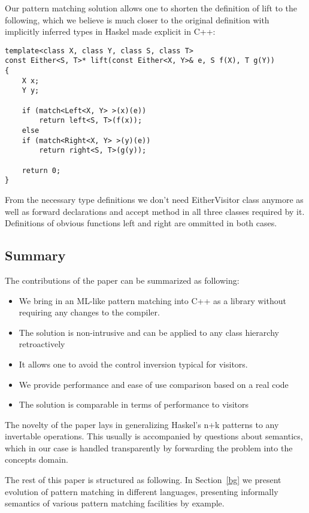 \documentclass[submission,copyright]{eptcs}
\begin{document}
Our pattern matching solution allows one to shorten the definition of lift to the 
following, which we believe is much closer to the original definition with 
implicitly inferred types in Haskel made explicit in C++: 

\begin{lstlisting}
template<class X, class Y, class S, class T>
const Either<S, T>* lift(const Either<X, Y>& e, S f(X), T g(Y))
{
    X x;
    Y y;
    
    if (match<Left<X, Y> >(x)(e))
        return left<S, T>(f(x));
    else
    if (match<Right<X, Y> >(y)(e))
        return right<S, T>(g(y));

    return 0;
}
\end{lstlisting}

From the necessary type definitions we don't need EitherVisitor class anymore 
as well as forward declarations and accept method in all three classes required 
by it. Definitions of obvious functions left and right are ommitted in both 
cases.

\subsection{Summary}

The contributions of the paper can be summarized as following:

\begin{itemize}
\item We bring in an ML-like pattern matching into C++ as a library without 
      requiring any changes to the compiler.
\item The solution is non-intrusive and can be applied to any class hierarchy retroactively
\item It allows one to avoid the control inversion typical for visitors.
\item We provide performance and ease of use comparison based on a real code
\item The solution is comparable in terms of performance to visitors
\end{itemize}

The novelty of the paper lays in generalizing Haskel's n+k patterns to any 
invertable operations. This usually is accompanied by questions about semantics, 
which in our case is handled transparently by forwarding the problem into the 
concepts domain.

The rest of this paper is structured as following. In Section~\ref{bg} we 
present evolution of pattern matching in different languages, presenting 
informally semantics of various pattern matching facilities by example.
\end{document}
